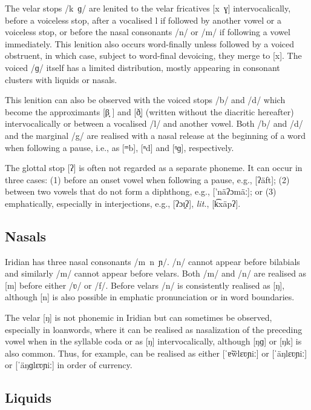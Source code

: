 The velar stops /k~ɡ/ are lenited to the velar fricatives [x~ɣ]
intervocalically, before a voiceless stop, after a vocalised l if followed by
another vowel or a voiceless stop, or before the nasal consonants /n/ or /m/ if
following a vowel immediately. This lenition also occurs word-finally unless
followed by a voiced obstruent, in which case, subject to word-final devoicing,
they merge to [x]. The voiced /ɡ/ itself has a limited distribution, mostly
appearing in consonant clusters with liquids or nasals.

This lenition can also be observed with the voiced stops /b/ and /d/ which
become the approximants [β̞	] and [ð̞] (written without the diacritic hereafter)
intervocalically or between a vocalised /l/ and another vowel. Both /b/ and /d/
and the marginal /g/ are realised with a nasal release at the beginning of a
word when following a pause, i.e., as [ᵐb], [ⁿd] and [ᵑɡ], respectively.

The glottal stop [ʔ] is often not regarded as a separate phoneme. It can occur
in three cases: (1) before an onset vowel when following a pause, e.g.,
 [ʔäft]; (2) between two vowels that do not form a diphthong,
e.g.,  ['näʔɔmäː]; or (3) emphatically, especially in
interjections, e.g.,  [ʔɔɪ̯ʔ], 
\emph{lit.},  [k͡xäpʔ].


\subsection{Nasals}
Iridian has three nasal consonants /m~n~ɲ/. /n/ cannot appear before bilabials
and similarly /m/ cannot appear before velars. Both /m/ and /n/ are realised as
[m] before either /ʋ/ or /f/. Before velars /n/ is consistently realised as [ŋ],
although [n] is also possible in emphatic pronunciation or in word boundaries.

The velar [ŋ] is not phonemic in Iridian but can sometimes be observed,
especially in loanwords, where it can be realised as nasalization of the
preceding vowel when in the syllable coda or as [ŋ] intervocalically, although
[ŋɡ] or [ŋk] is also common. Thus, for example,  can be
realised as either [ˈɐ̃w̃lɛʋɲiː] or [ˈäŋlɛʋɲiː] or [ˈäŋɡlɛʋɲiː] in order of
currency.

\subsection{Liquids}

